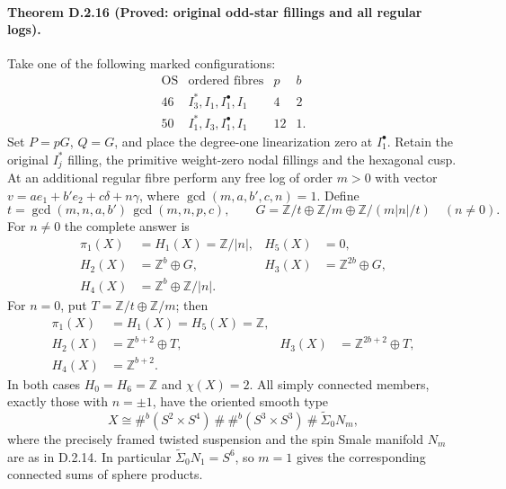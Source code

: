 \paragraph{Theorem D.2.16 (Proved: original odd-star fillings and all regular logs).}
Take one of the following marked configurations:
\[
\begin{array}{c|l|r|r}
 \mathrm{OS}&\text{ordered fibres}&p&b\\\hline
 46&I_3^*,I_1,I_1^\bullet,I_1&4&2\\
 50&I_1^*,I_3,I_1^\bullet,I_1&12&1.
\end{array}
\]
Set $P=pG$, $Q=G$, and place the degree-one linearization
zero at $I_1^\bullet$. Retain the original $I_j^*$ filling,
the primitive weight-zero nodal fillings and the hexagonal cusp.
At an additional regular fibre perform any free log of order
$m>0$ with vector $v=a e_1+b' e_2+c\delta+n\gamma$,
where $\gcd(m,a,b',c,n)=1$. Define
\[
 t=\gcd(m,n,a,b')\,\gcd(m,n,p,c),\qquad
 G=\mathbb Z/t\oplus\mathbb Z/m\oplus\mathbb Z/(m|n|/t)
 \quad(n\ne0).
\]
For $n\ne0$ the complete answer is
\[
\begin{aligned}
 \pi_1(X)&=H_1(X)=\mathbb Z/|n|, &H_5(X)&=0,\\
 H_2(X)&=\mathbb Z^b\oplus G,
 &H_3(X)&=\mathbb Z^{2b}\oplus G,\\
 H_4(X)&=\mathbb Z^b\oplus\mathbb Z/|n|.
\end{aligned}
\tag{D.T1}
\]
For $n=0$, put $T=\mathbb Z/t\oplus\mathbb Z/m$; then
\[
\begin{aligned}
 \pi_1(X)&=H_1(X)=H_5(X)=\mathbb Z,\\
 H_2(X)&=\mathbb Z^{b+2}\oplus T,
 &H_3(X)&=\mathbb Z^{2b+2}\oplus T,\\
 H_4(X)&=\mathbb Z^{b+2}.
\end{aligned}
\tag{D.T2}
\]
In both cases $H_0=H_6=\mathbb Z$ and $\chi(X)=2$.
All simply connected members, exactly those with $n=\pm1$,
have the oriented smooth type
\[
 X\cong \#^b(S^2\times S^4)\ \#\ \#^b(S^3\times S^3)
                   \ \#\ \widetilde\Sigma_0 N_m,
 \tag{D.T3}
\]
where the precisely framed twisted suspension and the spin
Smale manifold $N_m$ are as in D.2.14. In particular
$\widetilde\Sigma_0N_1=S^6$, so $m=1$ gives the corresponding
connected sums of sphere products.
